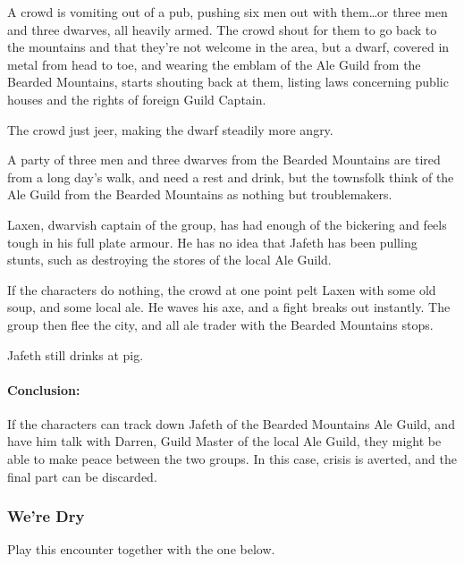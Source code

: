 \begin{boxtext}
	A crowd is vomiting out of a pub, pushing six men out with them\ldots or three men and three dwarves, all heavily armed.  The crowd shout for them to go back to the mountains and that they're not welcome in the area, but a dwarf, covered in metal from head to toe, and wearing the emblam of the Ale Guild from the Bearded Mountains, starts shouting back at them, listing laws concerning public houses and the rights of foreign Guild Captain.

	The crowd just jeer, making the dwarf steadily more angry.
\end{boxtext}

A party of three men and three dwarves from the Bearded Mountains are tired from a long day's walk, and need a rest and drink, but the townsfolk think of the Ale Guild from the Bearded Mountains as nothing but troublemakers.

Laxen, dwarvish captain of the group, has had enough of the bickering and feels tough in his full plate armour.  He has no idea that Jafeth has been pulling stunts, such as destroying the stores of the local Ale Guild.

If the characters do nothing, the crowd at one point pelt Laxen with some old soup, and some local ale.  He waves his axe, and a fight breaks out instantly.  The group then flee the city, and all ale trader with the Bearded Mountains stops.

\dwarvensoldier


\dwarventrader

\humansoldier

Jafeth still drinks at \gls{pig}.  

\paragraph{Conclusion:} If the characters can track down Jafeth of the Bearded Mountains Ale Guild, and have him talk with Darren, Guild Master of the local Ale Guild, they might be able to make peace between the two groups.  In this case, crisis is averted, and the final part can be discarded.

\subsubsection{We're Dry}
Play this encounter together with the one below.

